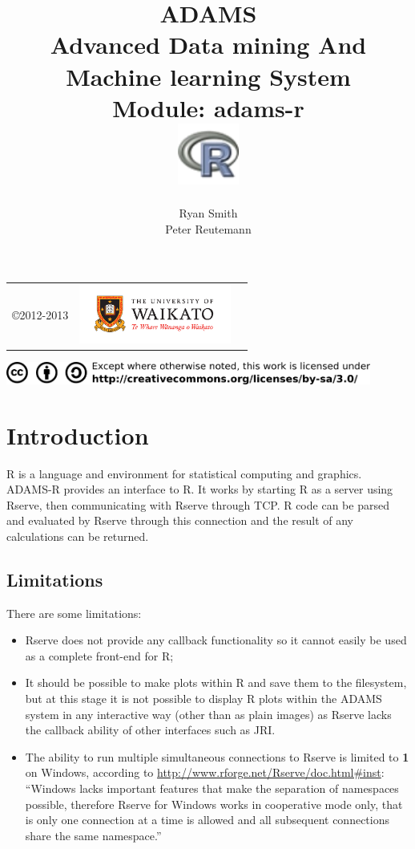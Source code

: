 \documentclass[a4paper]{book}
\title{
  \textbf{ADAMS} \\
  {\Large \textbf{A}dvanced \textbf{D}ata mining \textbf{A}nd \textbf{M}achine
  learning \textbf{S}ystem} \\
  {\Large Module: adams-r} \\
  \vspace{1cm}
  \includegraphics[width=2cm]{images/r-module.png} \\
}
\author{
  Ryan Smith \\
  Peter Reutemann
}
\begin{document}
\begin{titlepage}
\maketitle

\thispagestyle{empty}
\center
\begin{table}[b]
	\begin{tabular}{c l l}
		\parbox[c][2cm]{2cm}{\copyright 2012-2013} &
		\parbox[c][2cm]{5cm}{\includegraphics[width=5cm]{images/coat_of_arms.pdf}}
	\end{tabular}
	\includegraphics[width=12cm]{images/cc.png} \\
\end{table}

\end{titlepage}

\tableofcontents
\listoffigures

\chapter{Introduction}
R is a language and environment for statistical computing and graphics. ADAMS-R provides an interface to R. It works by starting R as a server using
Rserve\cite{rserve}, then communicating with Rserve through TCP. R code can be parsed and evaluated
by Rserve through this connection and the result of any calculations can be
returned. 

\section{Limitations}
There are some limitations: 
\begin{itemize}
	\item Rserve does not provide any callback
functionality so it cannot easily be used as a complete front-end for R;
	\item It should be possible to make plots within R and save them to the
filesystem, but at this stage it is not possible to display R plots within the ADAMS system in
any interactive way (other than as plain images) as Rserve lacks the callback
ability of other interfaces such as JRI.
\item The ability to run multiple simultaneous connections to Rserve is limited
to \textbf{1} on Windows, according to \url{http://www.rforge.net/Rserve/doc.html#inst}:
``Windows lacks important features that make the separation of namespaces possible, therefore Rserve for Windows works in cooperative mode only, that is only one connection at a time is allowed and all subsequent connections share the same namespace.''
\end{itemize}
\end{document}

